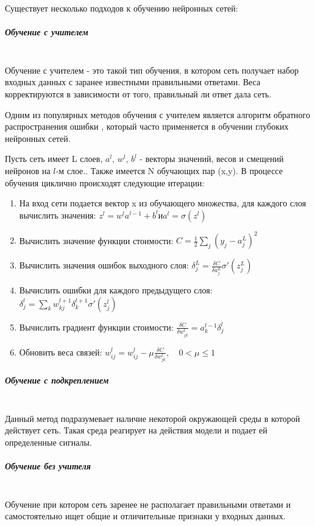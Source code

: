 Существует несколько подходов к обучению нейронных сетей:

\subparagraph{Обучение с учителем} \mbox{} \\   
Обучение с учителем - это такой тип обучения, в котором сеть получает набор входных данных с заранее известными правильными ответами. Веса корректируются в зависимости от того, правильный ли ответ дала сеть. 

Одним из популярных методов обучения с учителем является алгоритм обратного распространения ошибки \cite{Nielsen2015}, который часто применяется в обучении глубоких нейронных сетей. 

Пусть сеть имеет L слоев, $a^l$, $w_{}^l$, $b^l$ - векторы значений, весов и смещений нейронов на $l$-м слое.. Также имеется N обучающих пар (x,y). 
В процессе обучения циклично происходят следующие итерации: 

\begin{enumerate}
    \item На вход сети подается вектор x из обучающего множества, для каждого слоя вычислить значения: \hfill $z^l = w^la^{l-1}+b^l и a^l = \sigma(z^l)$
    \item Вычислить значение функции стоимости: \hfill $C = \frac{1}{2}\sum_j{(y_j-a_j^L)^2}$
    \item Вычислить значения ошибок выходного слоя: \hfill $\delta_j^L=\frac{\delta C}{\delta a_j^L}\sigma'(z_j^L)$
    \item Вычислить ошибки для каждого предыдущего слоя: \hfill $\delta_j^l=\sum_k{w_{kj}^{l+1} \delta_k^{l+1}\sigma'(z_j^l)}$
    \item Вычислить градиент функции стоимости: \hfill $\frac{\delta C}{\delta w_{jk}^l} = a_k^{l-1} \delta_j^l$ %
    \item Обновить веса связей: \hfill $w_{ij}^l=w_{ij}^l-\mu\frac{\delta C}{\delta w_{jk}^l},\hspace{1em} 0<\mu \leqslant 1$
\end{enumerate}

\subparagraph{Обучение с подкреплением}\mbox{} \\
 Данный метод подразумевает наличие некоторой окружающей среды в которой действует сеть. Такая среда реагирует на действия модели и подает ей определенные сигналы.  

\subparagraph{Обучение без учителя}\mbox{} \\
Обучение при котором сеть заренее не располагает правильными ответами и самостоятельно ищет общие и отличительные признаки у входных данных. 


